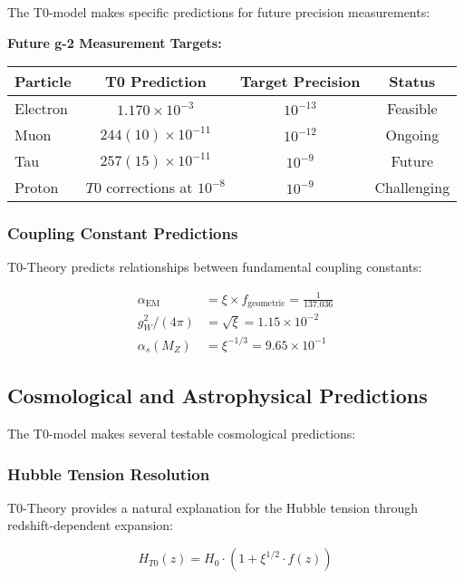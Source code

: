 \documentclass[12pt,a4paper]{article}
\theoremstyle{definition}
\begin{document}
The T0-model makes specific predictions for future precision measurements:

\noindent
\textbf{Future g-2 Measurement Targets:}

\begin{center}
	\begin{tabular}{lccc}
		\toprule
		\textbf{Particle} & \textbf{T0 Prediction} & \textbf{Target Precision} & \textbf{Status} \\
		\midrule
		Electron & $1.170 \times 10^{-3}$ & $10^{-13}$ & Feasible \\
		Muon & $244(10) \times 10^{-11}$ & $10^{-12}$ & Ongoing \\
		Tau & $257(15) \times 10^{-11}$ & $10^{-9}$ & Future \\
		Proton & $T0$ corrections at $10^{-8}$ & $10^{-9}$ & Challenging \\
		\bottomrule
	\end{tabular}
\end{center}

\subsubsection{Coupling Constant Predictions}

T0-Theory predicts relationships between fundamental coupling constants:

\begin{align}
	\alpha_{\text{EM}} &= \xi \times f_{\text{geometric}} = \frac{1}{137.036} \\
	g_W^2/(4\pi) &= \sqrt{\xi} = 1.15 \times 10^{-2} \\
	\alpha_s(M_Z) &= \xi^{-1/3} = 9.65 \times 10^{-1}
\end{align}

\subsection{Cosmological and Astrophysical Predictions}

The T0-model makes several testable cosmological predictions:

\subsubsection{Hubble Tension Resolution}

T0-Theory provides a natural explanation for the Hubble tension through redshift-dependent expansion:

\begin{equation}
	\boxed{H_{T0}(z) = H_0 \cdot \left(1 + \xi^{1/2} \cdot f(z)\right)}
\end{equation}
\end{document}
